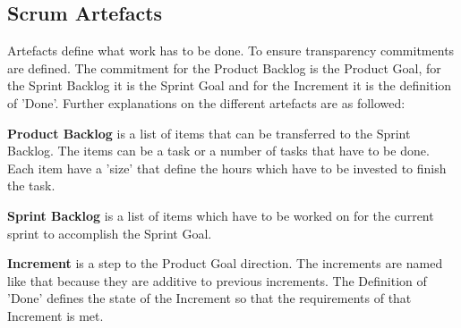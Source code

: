 \subsection{Scrum Artefacts} \label{sec:Scrum Artefacts}

Artefacts define what work has to be done. To ensure transparency commitments are defined. The commitment for the Product Backlog is the Product Goal, for the Sprint Backlog it is the Sprint Goal and for the Increment it is the definition of 'Done'. Further explanations on the different artefacts are as followed: \cite{scrum_guide}

\textbf{Product Backlog} is a list of items that can be transferred to the Sprint Backlog. The items can be a task or a number of tasks that have to be done. Each item have a 'size' that define the hours which have to be invested to finish the task. \cite{scrum_guide}

\textbf{Sprint Backlog} is a list of items which have to be worked on for the current sprint to accomplish the Sprint Goal. \cite{scrum_guide}

\textbf{Increment} is a step to the Product Goal direction. The increments are named like that because they are additive to previous increments. The Definition of 'Done' defines the state of the Increment so that the requirements of that Increment is met. \cite{scrum_guide}
